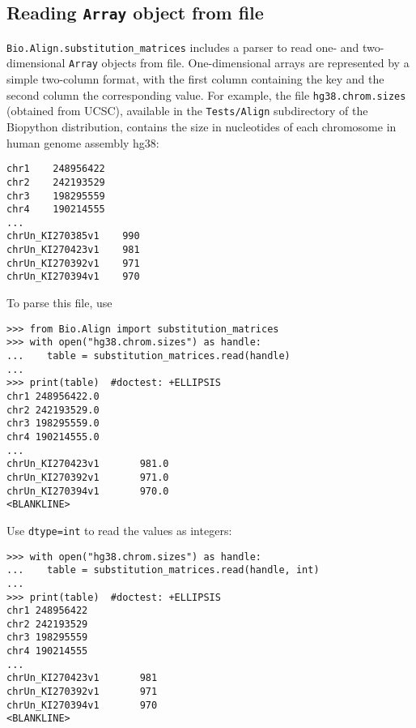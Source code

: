\subsection*{Reading \texttt{Array} object from file}

\verb+Bio.Align.substitution_matrices+ includes a parser to read one- and two-dimensional \verb+Array+ objects from file. One-dimensional arrays are represented by a simple two-column format, with the first column containing the key and the second column the corresponding value. For example, the file \verb+hg38.chrom.sizes+ (obtained from UCSC), available in the \verb+Tests/Align+ subdirectory of the Biopython distribution, contains the size in nucleotides of each chromosome in human genome assembly hg38:
\begin{verbatim}
chr1    248956422
chr2    242193529
chr3    198295559
chr4    190214555
...
chrUn_KI270385v1    990
chrUn_KI270423v1    981
chrUn_KI270392v1    971
chrUn_KI270394v1    970
\end{verbatim}
To parse this file, use

\begin{verbatim}
>>> from Bio.Align import substitution_matrices
>>> with open("hg38.chrom.sizes") as handle:
...    table = substitution_matrices.read(handle)
...
>>> print(table)  #doctest: +ELLIPSIS
chr1 248956422.0
chr2 242193529.0
chr3 198295559.0
chr4 190214555.0
...
chrUn_KI270423v1       981.0
chrUn_KI270392v1       971.0
chrUn_KI270394v1       970.0
<BLANKLINE>
\end{verbatim}
Use \verb+dtype=int+ to read the values as integers:

\begin{verbatim}
>>> with open("hg38.chrom.sizes") as handle:
...    table = substitution_matrices.read(handle, int)
...
>>> print(table)  #doctest: +ELLIPSIS
chr1 248956422
chr2 242193529
chr3 198295559
chr4 190214555
...
chrUn_KI270423v1       981
chrUn_KI270392v1       971
chrUn_KI270394v1       970
<BLANKLINE>
\end{verbatim}

